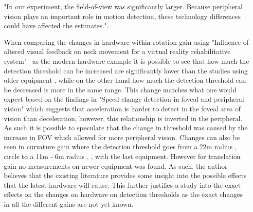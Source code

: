 "In our experiment, the field-of-view was significantly larger. Because peripheral vision plays an important role in motion detection, these technology differences could have affected the estimates."\cite{grechkin2016revisiting}.
\bigskip

\noindent
When comparing the changes in hardware within rotation gain using "Influence of altered visual feedback on neck movement for a virtual reality rehabilitative system"~\cite{chen2014influence} as the modern hardware example it is possible to see that how much the detection threshold can be increased are significantly lower than the studies using older equipment \cite{steinicke2010estimation}, \cite{steinicke2008analyses} while on the other hand how much the detection threshold can be decreased is more in the same range. This change matches what one would expect based on the findings in "Speed change detection in foveal and peripheral vision"\cite{traschutz2012speed} which suggests that acceleration is harder to detect in the foveal area of vision than deceleration, however, this relationship is inverted in the peripheral. As such it is possible to speculate that the change in threshold was caused by the increase in FOV which allowed for more peripheral vision. Changes can also be seen in curvature gain where the detection threshold goes from a 22m radius \cite{steinicke2010estimation}, \cite{steinicke2008analyses} circle to a 11m - 6m radius \cite{neira2012redirected}, \cite{meyer2016detection}, \cite{grechkin2016revisiting} with the last equipment. However for translation gain no measurements on newer equipment was found. As such, the author believes that the existing literature provides some insight into the possible effects that the latest hardware will cause. This further justifies a study into the exact effects on the changes on hardware on detection thresholds as the exact changes in all the different gains are not yet known.


